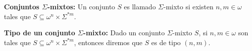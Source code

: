 \documentclass{article}
\begin{document}
\begin{flushleft}
\textbf{Conjuntos $\Sigma$-mixtos:} Un conjunto $S$ es llamado $\Sigma$-mixto si existen $n, m \in \omega$ tales que $S \subseteq \omega^n \times \Sigma^{*m}$.\linebreak

\textbf{Tipo de un conjunto $\Sigma$-mixto:} Dado un conjunto $\Sigma$-mixto $S$, si $n, m \in \omega$ son tales que $S \subseteq \omega^n \times \Sigma^{*m}$, entonces diremos que $S$ es de tipo $(n, m)$.



\end{flushleft}
\end{document}

